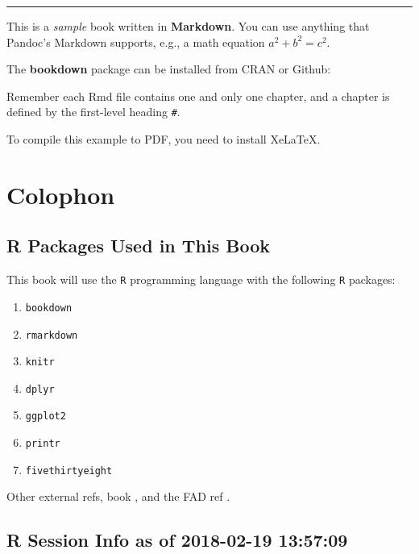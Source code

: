 \documentclass[]{book}
\providecommand{\tightlist}{%
  \setlength{\itemsep}{0pt}\setlength{\parskip}{0pt}}
\theoremstyle{definition}
\theoremstyle{definition}
\theoremstyle{definition}
\theoremstyle{remark}
\begin{document}
\begin{center}\rule{0.5\linewidth}{\linethickness}\end{center}

This is a \emph{sample} book written in \textbf{Markdown}. You can use
anything that Pandoc's Markdown supports, e.g., a math equation
\(a^2 + b^2 = c^2\).

The \textbf{bookdown} package can be installed from CRAN or Github:

Remember each Rmd file contains one and only one chapter, and a chapter
is defined by the first-level heading \texttt{\#}.

To compile this example to PDF, you need to install XeLaTeX.

\section*{Colophon}\label{colophon}

\subsection*{R Packages Used in This
Book}\label{r-packages-used-in-this-book}

This book will use the \texttt{R} programming language \citep{R-base}
with the following \texttt{R} packages:

\begin{enumerate}
\def\labelenumi{\arabic{enumi}.}
\tightlist
\item
  \texttt{bookdown} \citep{R-bookdown}
\item
  \texttt{rmarkdown} \citep{R-rmarkdown}
\item
  \texttt{knitr} \citep{R-knitr}
\item
  \texttt{dplyr} \citep{R-dplyr}
\item
  \texttt{ggplot2} \citep{R-ggplot2}
\item
  \texttt{printr} \citep{R-printr}
\item
  \texttt{fivethirtyeight} \citep{R-fivethirtyeight}
\end{enumerate}

Other external refs, book \citep{xie2015}, and the FAD ref
\citep{Miller_Epstein_Bishop_Keitner_1985}.

\subsection*{R Session Info as of 2018-02-19
13:57:09}\label{r-session-info-as-of-2018-02-19-135709}
\end{document}
